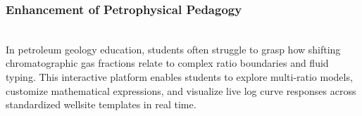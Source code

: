 \subsubsection{Enhancement of Petrophysical Pedagogy}~\\
In petroleum geology education, students often struggle to grasp how shifting chromatographic gas fractions relate to complex ratio boundaries and fluid typing. This interactive platform enables students to explore multi-ratio models, customize mathematical expressions, and visualize live log curve responses across standardized wellsite templates in real time.